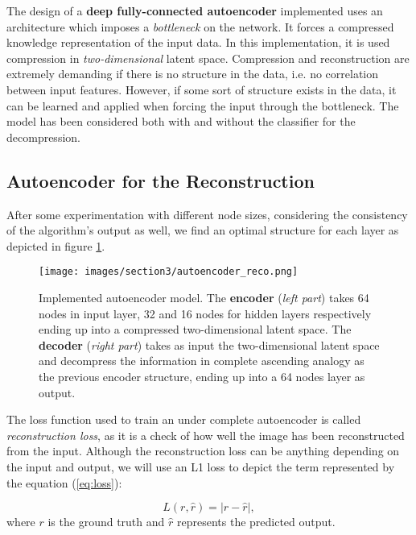 \documentclass{article}
\begin{document}
\par The design of a \textbf{deep fully-connected autoencoder} implemented uses an architecture which imposes a \textit{bottleneck} on the network. 
It forces a compressed knowledge representation of the input data.
In this implementation, it is used compression in \textit{two-dimensional} latent space. 
Compression and reconstruction are extremely demanding if there is no structure in the data, 
i.e. no correlation between input features. 
However, if some sort of structure exists in the data, it can be learned and applied when forcing the input through the bottleneck.
The model has been considered both with and without the classifier for the decompression.

\subsection{Autoencoder for the Reconstruction}
After some experimentation with different node sizes, considering the consistency of 
the algorithm's output as well, we find an optimal structure for each layer as depicted in figure \ref{fig:ae}. 

\begin{figure}[H]
  \centering
  \texttt{[image: images/section3/autoencoder\_reco.png]}
  \caption{Implemented autoencoder model. The \textbf{encoder} (\textit{left part}) takes 64 nodes in input layer, 32 and 16 nodes for
  hidden layers respectively ending up into a compressed two-dimensional latent space. 
  The \textbf{decoder} (\textit{right part}) takes as input the two-dimensional latent space and decompress the information 
  in complete ascending analogy as the previous encoder structure, ending up into a 64 nodes layer as output.}
  \label{fig:ae}
  \end{figure}

\par The loss function used to train an under complete autoencoder is called \textit{reconstruction loss},
as it is a check of how well the image has been reconstructed from the input.
Although the reconstruction loss can be anything depending on the input and output,
we will use an L1 loss to depict the term represented by the equation (\ref{eq:loss}):

\begin{equation}
  L ( r, \hat{r} ) = | r - \hat{r} |,
  \label{eq:loss} 
\end{equation}
where $r$ is the ground truth and $\hat{r}$ represents the predicted output.
\end{document}
